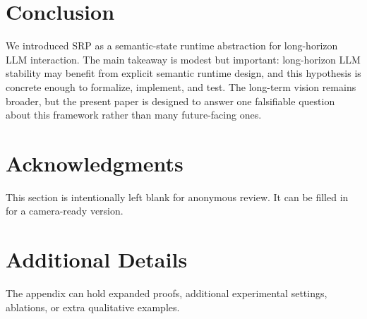 \documentclass[11pt]{article}
\begin{document}
\section{Conclusion}
We introduced SRP as a semantic-state runtime abstraction for long-horizon LLM interaction. The main takeaway is modest but important: long-horizon LLM stability may benefit from explicit semantic runtime design, and this hypothesis is concrete enough to formalize, implement, and test. The long-term vision remains broader, but the present paper is designed to answer one falsifiable question about this framework rather than many future-facing ones.

\section*{Acknowledgments}
This section is intentionally left blank for anonymous review. It can be filled in for a camera-ready version.

\appendix
\section{Additional Details}
The appendix can hold expanded proofs, additional experimental settings, ablations, or extra qualitative examples.



\end{document}
